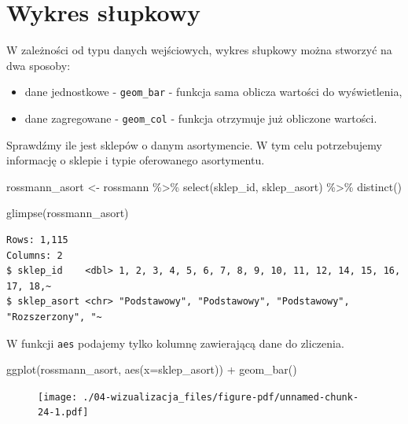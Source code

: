 \documentclass[
  letterpaper,
  DIV=11,
  numbers=noendperiod]{scrreprt}
\newenvironment{Shaded}{\begin{snugshade}}{\end{snugshade}}
\newcommand{\AttributeTok}[1]{\textcolor[rgb]{0.40,0.45,0.13}{#1}}
\newcommand{\FunctionTok}[1]{\textcolor[rgb]{0.28,0.35,0.67}{#1}}
\newcommand{\NormalTok}[1]{\textcolor[rgb]{0.00,0.23,0.31}{#1}}
\newcommand{\OtherTok}[1]{\textcolor[rgb]{0.00,0.23,0.31}{#1}}
\newcommand{\SpecialCharTok}[1]{\textcolor[rgb]{0.37,0.37,0.37}{#1}}
\providecommand{\tightlist}{%
  \setlength{\itemsep}{0pt}\setlength{\parskip}{0pt}}\usepackage{longtable,booktabs,array}
\begin{document}
\hypertarget{wykres-sux142upkowy}{%
\section{Wykres słupkowy}\label{wykres-sux142upkowy}}

W zależności od typu danych wejściowych, wykres słupkowy można stworzyć
na dwa sposoby:

\begin{itemize}
\tightlist
\item
  dane jednostkowe - \texttt{geom\_bar} - funkcja sama oblicza wartości
  do wyświetlenia,
\item
  dane zagregowane - \texttt{geom\_col} - funkcja otrzymuje już
  obliczone wartości.
\end{itemize}

Sprawdźmy ile jest sklepów o danym asortymencie. W tym celu potrzebujemy
informację o sklepie i typie oferowanego asortymentu.

\begin{Shaded}
\begin{Highlighting}[]
\NormalTok{rossmann\_asort }\OtherTok{\textless{}{-}}\NormalTok{ rossmann }\SpecialCharTok{\%\textgreater{}\%}
  \FunctionTok{select}\NormalTok{(sklep\_id, sklep\_asort) }\SpecialCharTok{\%\textgreater{}\%}
  \FunctionTok{distinct}\NormalTok{()}

\FunctionTok{glimpse}\NormalTok{(rossmann\_asort)}
\end{Highlighting}
\end{Shaded}

\begin{verbatim}
Rows: 1,115
Columns: 2
$ sklep_id    <dbl> 1, 2, 3, 4, 5, 6, 7, 8, 9, 10, 11, 12, 14, 15, 16, 17, 18,~
$ sklep_asort <chr> "Podstawowy", "Podstawowy", "Podstawowy", "Rozszerzony", "~
\end{verbatim}

W funkcji \texttt{aes} podajemy tylko kolumnę zawierającą dane do
zliczenia.

\begin{Shaded}
\begin{Highlighting}[]
\FunctionTok{ggplot}\NormalTok{(rossmann\_asort, }\FunctionTok{aes}\NormalTok{(}\AttributeTok{x=}\NormalTok{sklep\_asort)) }\SpecialCharTok{+}
  \FunctionTok{geom\_bar}\NormalTok{()}
\end{Highlighting}
\end{Shaded}

\begin{figure}[H]

{\centering \texttt{[image: ./04-wizualizacja\_files/figure-pdf/unnamed-chunk-24-1.pdf]}

}

\end{figure}
\end{document}
